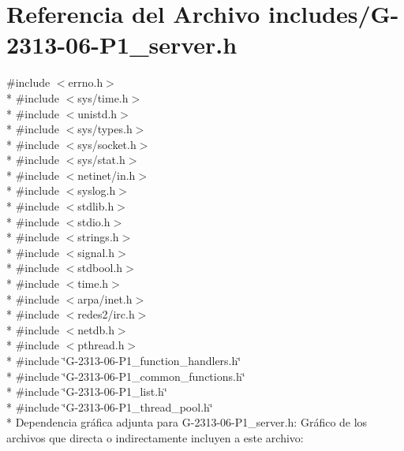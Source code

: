 \hypertarget{G-2313-06-P1__server_8h}{}\section{Referencia del Archivo includes/\+G-\/2313-\/06-\/\+P1\+\_\+server.h}
\label{G-2313-06-P1__server_8h}
{\ttfamily \#include $<$errno.\+h$>$}\\*
{\ttfamily \#include $<$sys/time.\+h$>$}\\*
{\ttfamily \#include $<$unistd.\+h$>$}\\*
{\ttfamily \#include $<$sys/types.\+h$>$}\\*
{\ttfamily \#include $<$sys/socket.\+h$>$}\\*
{\ttfamily \#include $<$sys/stat.\+h$>$}\\*
{\ttfamily \#include $<$netinet/in.\+h$>$}\\*
{\ttfamily \#include $<$syslog.\+h$>$}\\*
{\ttfamily \#include $<$stdlib.\+h$>$}\\*
{\ttfamily \#include $<$stdio.\+h$>$}\\*
{\ttfamily \#include $<$strings.\+h$>$}\\*
{\ttfamily \#include $<$signal.\+h$>$}\\*
{\ttfamily \#include $<$stdbool.\+h$>$}\\*
{\ttfamily \#include $<$time.\+h$>$}\\*
{\ttfamily \#include $<$arpa/inet.\+h$>$}\\*
{\ttfamily \#include $<$redes2/irc.\+h$>$}\\*
{\ttfamily \#include $<$netdb.\+h$>$}\\*
{\ttfamily \#include $<$pthread.\+h$>$}\\*
{\ttfamily \#include \char`\"{}G-\/2313-\/06-\/\+P1\+\_\+function\+\_\+handlers.\+h\char`\"{}}\\*
{\ttfamily \#include \char`\"{}G-\/2313-\/06-\/\+P1\+\_\+common\+\_\+functions.\+h\char`\"{}}\\*
{\ttfamily \#include \char`\"{}G-\/2313-\/06-\/\+P1\+\_\+list.\+h\char`\"{}}\\*
{\ttfamily \#include \char`\"{}G-\/2313-\/06-\/\+P1\+\_\+thread\+\_\+pool.\+h\char`\"{}}\\*
Dependencia gráfica adjunta para G-\/2313-\/06-\/\+P1\+\_\+server.h\+:
Gráfico de los archivos que directa o indirectamente incluyen a este archivo\+:
